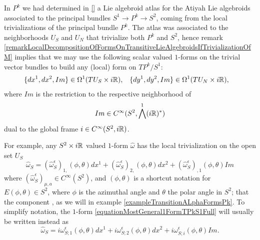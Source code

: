 \begin{example}[$TP^k/S^1$ over $S^2$]\label{exampleFormsTPkBuildingBLocksandMostGeneral1FormOn}
In $P^k$ we had determined in \ref{} a Lie algebroid atlas for the Atiyah Lie algebroids associated to the principal bundles $S^1 \to P^k \to S^2$, coming from the local trivializations of the principal bundle $P^k$. The atlas was associated to the neighborhoods $U_S$ and $U_N$ that trivialize both $P^k$ and $S^2$, hence remark \ref{remarkLocalDecompositionOfFormsOnTransitiveLieAlgebroidsIfTrivializationOfM} implies that we may use the following scalar valued $1$-forms on the trivial vector bundles to build any (local) form on $TP^k/S^1$:
\begin{align}
    \{dx^1, dx^2, Im\} &\in \Omega^1(TU_S \times i\mathbb{R}), &
    \{dy^1, dy^2, Im\} &\in \Omega^1(TU_N \times i\mathbb{R}),
\end{align}
where $Im$ is the restriction to the respective neighborhood of 
\begin{equation}\label{equationDefinitionImS2TPkAsForm}
    Im \in C^\infty(S^2, \bigwedge^1 (i\mathbb{R})^*)
\end{equation} 
dual to the global frame $i \in C^\infty(S^2, i\mathbb{R})$.

For example, any $S^2 \times i\mathbb{R}$ valued $1$-form $\hat \omega$ has the local trivialization on the open set $U_S$
\begin{equation}\label{equationMostGeneral1FormTPkS1Full}
    \hat \omega_S = (\hat \omega^\epsilon_{S})_{1,}(\phi, \theta) dx^1 + (\hat \omega^\epsilon_{S})_{2,}(\phi, \theta) dx^2 + (\hat \omega^\epsilon_{S})_{,1}(\phi, \theta) Im
\end{equation}
where $(\hat \omega^{\epsilon}_{S})_{\mu,  a} \in C^\infty(S^2)$, and $(\phi, \theta)$ is a shortcut notation for $E(\phi, \theta) \in S^2$, where $\phi$ is the azimuthal angle and $\theta$ the polar angle in $S^2$; that the component , as we will in example \ref{exampleTransitionALphaFormsPk}. 
To simplify notation, the $1$-form \eqref{equationMostGeneral1FormTPkS1Full} will usually be written instead as
\begin{equation}\label{equationMostGeneral1FormTPkS1Simplified}
    \hat \omega_S = i\omega^\epsilon_{S; 1}(\phi, \theta) dx^1 + i\omega^\epsilon_{S; 2}(\phi, \theta) dx^2 + i\omega^\epsilon_{S; i}(\phi, \theta) Im.
\end{equation}


\end{example}
